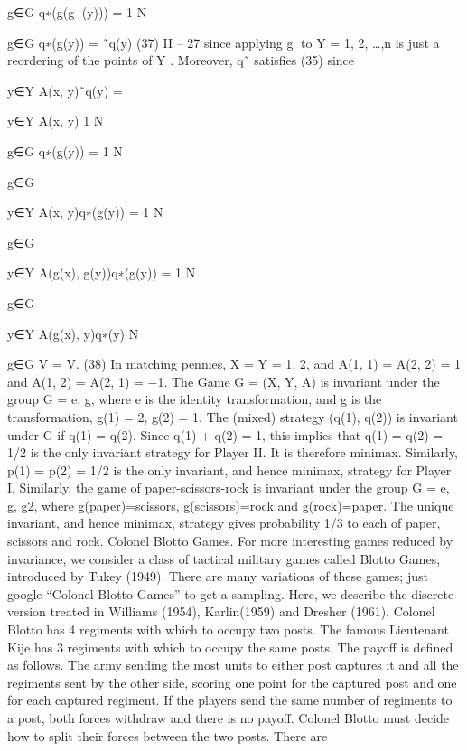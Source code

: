 \documentclass[]{report}
\begin{document}
g∈G
q∗(g(g
(y)))
= 1
N


g∈G
q∗(g(y)) = ˜q(y)
(37)
II – 27
since applying g to Y = {1, 2, \ldots,n} is just a reordering of the points of Y . Moreover, q˜
satisfies (35) since


y∈Y
A(x, y)˜q(y) = 

y∈Y
A(x, y) 1
N


g∈G
q∗(g(y))
= 1
N


g∈G


y∈Y
A(x, y)q∗(g(y))
= 1
N


g∈G


y∈Y
A(g(x), g(y))q∗(g(y))
= 1
N


g∈G


y∈Y
A(g(x), y)q∗(y)
N


g∈G
V = V.
(38)
In matching pennies, X = Y = {1, 2}, and A(1, 1) = A(2, 2) = 1 and A(1, 2) =
A(2, 1) = −1. The Game G = (X, Y, A) is invariant under the group G = {e, g}, where e is
the identity transformation, and g is the transformation, g(1) = 2, g(2) = 1. The (mixed)
strategy (q(1), q(2)) is invariant under G if q(1) = q(2). Since q(1) + q(2) = 1, this implies
that q(1) = q(2) = 1/2 is the only invariant strategy for Player II. It is therefore minimax.
Similarly, p(1) = p(2) = 1/2 is the only invariant, and hence minimax, strategy for Player
I.
Similarly, the game of paper-scissors-rock is invariant under the group G = {e, g, g2},
where g(paper)=scissors, g(scissors)=rock and g(rock)=paper. The unique invariant, and
hence minimax, strategy gives probability 1/3 to each of paper, scissors and rock.
Colonel Blotto Games. For more interesting games reduced by invariance, we
consider a class of tactical military games called Blotto Games, introduced by Tukey
(1949). There are many variations of these games; just google “Colonel Blotto Games”
to get a sampling. Here, we describe the discrete version treated in Williams (1954),
Karlin(1959) and Dresher (1961).
Colonel Blotto has 4 regiments with which to occupy two posts. The famous Lieutenant
Kije has 3 regiments with which to occupy the same posts. The payoff is defined as
follows. The army sending the most units to either post captures it and all the regiments
sent by the other side, scoring one point for the captured post and one for each captured
regiment. If the players send the same number of regiments to a post, both forces withdraw
and there is no payoff.
Colonel Blotto must decide how to split their forces between the two posts. There are
\end{document}
